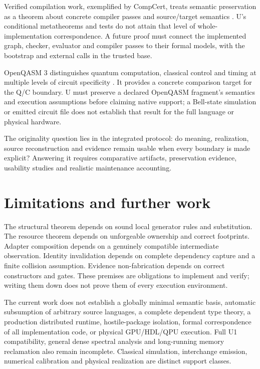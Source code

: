 \documentclass[11pt]{article}
\theoremstyle{remark}
\begin{document}
Verified compilation work, exemplified by CompCert, treats semantic
preservation as a theorem about concrete compiler passes and source/target
semantics \cite{leroy-compcert}. U's conditional metatheorems and tests do
not attain that level of whole-implementation correspondence. A future
proof must connect the implemented graph, checker, evaluator and compiler
passes to their formal models, with the bootstrap and external calls in
the trusted base.

OpenQASM 3 distinguishes quantum computation, classical control and timing
at multiple levels of circuit specificity \cite{cross-openqasm}. It provides
a concrete comparison target for the Q/C boundary. U must preserve a
declared OpenQASM fragment's semantics and execution assumptions before
claiming native support; a Bell-state simulation or emitted circuit file
does not establish that result for the full language or physical hardware.

The originality question lies in the integrated protocol: do meaning,
realization, source reconstruction and evidence remain usable when every
boundary is made explicit? Answering it requires comparative artifacts,
preservation evidence, usability studies and realistic maintenance accounting.

\section{Limitations and further work}

The structural theorem depends on sound local generator rules and
substitution. The resource theorem depends on unforgeable ownership and
correct footprints. Adapter composition depends on a genuinely compatible
intermediate observation. Identity invalidation depends on complete
dependency capture and a finite collision assumption. Evidence
non-fabrication depends on correct constructors and gates. These premises
are obligations to implement and verify; writing them down does not prove
them of every execution environment.

The current work does not establish a globally minimal semantic basis,
automatic subsumption of arbitrary source languages, a complete dependent
type theory, a production distributed runtime, hostile-package isolation,
formal correspondence of all implementation code, or physical GPU/HDL/QPU
execution. Full U1 compatibility, general dense spectral analysis and
long-running memory reclamation also remain incomplete. Classical
simulation, interchange emission, numerical calibration and physical
realization are distinct support classes.
\end{document}
